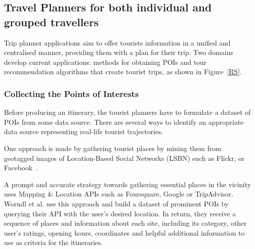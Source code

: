 
\subsection{Travel Planners for both individual and grouped travellers}


Trip planner applications aim to offer tourists information in a unified and
centralised manner, providing them with a plan for their trip. Two domains
develop current applications: methods for obtaining POIs and tour
recommendation algorithms that create tourist trips, as shown in Figure~\ref{RS}.


\subsubsection{Collecting the Points of Interests}

Before producing an itinerary, the tourist planners have to
formulate a dataset of POIs from some data source. There are
several ways to identify an appropriate data source representing
real-life tourist trajectories. 

One approach is made by gathering tourist places by mining them from
geotagged images of Location-Based Social Networks (LSBN) such as Flickr,
or Facebook~\cite{DeChoudhury2010, Memon2015, Lucchese2012, Lim2018a,
HuiLim, HuiLima, Kurashima2013, Kurashima2010, Brilhante2013, Brilhante2015 }.

A prompt and accurate strategy towards gathering essential places
in the vicinity uses Mapping \& Location APIs such as Foursquare,
Google or TripAdvisor. Worndl et al.\cite{Worndl2017} use this approach and build a
dataset of prominent POIs by querying their API with the user's
desired location. In return, they receive a sequence of places and
information about each site, including its category, other user's
ratings, opening hours, coordinates and helpful additional
information to use as criteria for the itineraries.



